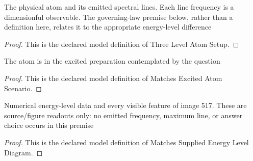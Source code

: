 \begin{definition}
  \label{def:physics:phyx-mini-0517:phyxminiproblems-problemphyxmini0517-threelevelatomsetup}
  The physical atom and its emitted spectral lines. Each line frequency is a dimensionful observable. The governing-law premise below, rather than a definition here, relates it to the appropriate energy-level difference
\end{definition}
\begin{proof}
  This is the declared model definition of Three Level Atom Setup.
\end{proof}
\begin{definition}
  \label{def:physics:phyx-mini-0517:phyxminiproblems-problemphyxmini0517-matchesexcitedatomscenario}
  The atom is in the excited preparation contemplated by the question
\end{definition}
\begin{proof}
  This is the declared model definition of Matches Excited Atom Scenario.
\end{proof}
\begin{definition}
  \label{def:physics:phyx-mini-0517:phyxminiproblems-problemphyxmini0517-matchessuppliedenergyleveldiagram}
  Numerical energy-level data and every visible feature of image 517. These are source/figure readouts only: no emitted frequency, maximum line, or answer choice occurs in this premise
\end{definition}
\begin{proof}
  This is the declared model definition of Matches Supplied Energy Level Diagram.
\end{proof}
